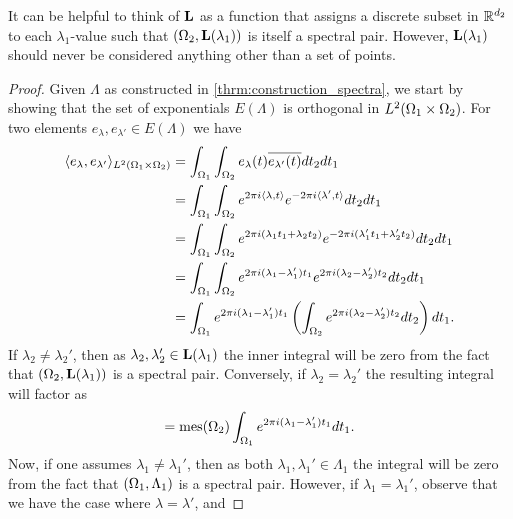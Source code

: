 \documentclass[../thesis.tex]{subfiles}
\begin{document}
\begin{remark}
    It can be helpful to think of $\mathbf{L}$ as a function that assigns a discrete subset in $\mathbb{R}^{d_2}$ to each $\lambda_1$-value such that $(\Omega_2,\mathbf{L}(\lambda_1))$ is itself a spectral pair. However, $\mathbf{L}(\lambda_1)$ should never be considered anything other than a set of points. 
\end{remark}

\begin{proof}
    Given $\Lambda$ as constructed in \cref{thrm:construction_spectra}, we start by showing that the set of exponentials $E(\Lambda)$ is orthogonal in $L^2(\Omega_1 \times \Omega_2)$. For two elements $e_\lambda,e_{\lambda'} \in E(\Lambda)$ we have %
    \begin{align*}
        \langle e_\lambda,e_{\lambda'}\rangle_{L^2(\Omega_1 \times \Omega_2)} 
        &= \int_{\Omega_1} \int_{\Omega_2} e_{\lambda}(t) \overline{e_{\lambda'}(t)} dt_2 dt_1\\ 
        &= \int_{\Omega_1} \int_{\Omega_2} e^{2\pi i \langle\lambda, t\rangle } e^{-2\pi i  \langle\lambda', t\rangle} dt_2 dt_1\\ 
        &= \int_{\Omega_1} \int_{\Omega_2} e^{2\pi i (\lambda_1 t_1+\lambda_2 t_2)} e^{-2\pi i(\lambda_1' t_1+\lambda_2' t_2)} dt_2 dt_1\\ 
        &= \int_{\Omega_1} \int_{\Omega_2} e^{2\pi i (\lambda_1- \lambda_1')t_1} e^{2\pi i (\lambda_2 - \lambda_2')t_2} dt_2 dt_1\\ 
        &= \int_{\Omega_1} e^{2\pi i  (\lambda_1- \lambda_1')t_1} \left(\int_{\Omega_2}  e^{2\pi i (\lambda_2 - \lambda_2')t_2} dt_2\right) dt_1.
    \end{align*}
    If $\lambda_2 \neq \lambda_2'$, then as $\lambda_2, \lambda_2' \in \mathbf{L}(\lambda_1)$ the inner integral will be zero from the fact that $(\Omega_2, \mathbf{L}(\lambda_1))$ is a spectral pair. Conversely, if $\lambda_2 = \lambda_2'$ the resulting integral will factor as %
    \begin{align*}
        = \operatorname{mes}(\Omega_2) \int_{\Omega_1} e^{2\pi i  (\lambda_1- \lambda_1')t_1} dt_1.
    \end{align*}
    Now, if one assumes $\lambda_1 \neq \lambda_1'$, then as both $\lambda_1, \lambda_1' \in \Lambda_1$ the integral will be zero from the fact that $(\Omega_1, \Lambda_1)$ is a spectral pair. However, if $\lambda_1 = \lambda_1'$, observe that we have the case where $\lambda = \lambda'$, and

\end{proof}
\end{document}

